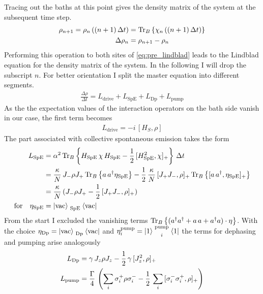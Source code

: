Tracing out the baths at this point gives the density matrix of the system at the subsequent time step. 
\begin{align*}
    \rho_{n+1}=\rho_n\left((n+1)\,\Delta t\right)&=\text{Tr}_B\left\{\chi_n\left((n+1)\,\Delta t\right)\right\}\\
    \Delta\rho_n&=\rho_{n+1}-\rho_n
\end{align*}
Performing this operation to both sites of \eqref{eq:pre_lindblad} leads to the Lindblad equation for the density matrix of the system. In the following I will drop the subscript $n$. For better orientation I split the master equation into different segments.
\begin{align*}
    \frac{\Delta\rho}{\Delta t}=L_\text{drive}+L_\text{SpE}+L_\text{Dp}+L_\text{pump}
\end{align*}
As the the expectation values of the interaction operators on the bath side vanish in our case, the first term becomes
\begin{align*}
    L_\text{drive}=-i\,[H_S,\rho]
\end{align*}
The part associated with collective spontaneous emission takes the form
\begin{align*}
    L_\text{SpE} &= \alpha^2\,\text{Tr}_B\left\{H_\text{SpE}\,\chi \,H_\text{SpE}-\frac{1}{2}\,[H_\text{SpE}^2,\chi]_+\right\}\,\Delta t\\
    &= \frac{\kappa}{N}\,J_-\rho J_+\,\text{Tr}_B\left\{a\,a^\dagger\eta_\text{SpE}\right\}-\frac{1}{2}\,\frac{\kappa}{N}\,[J_+J_-,\rho]_+\,\text{Tr}_B\left\{[a\,a^\dagger,\eta_\text{SpE}]_+\right\}\\
    &=\frac{\kappa}{N}\,(J_-\rho J_+-\frac{1}{2}\,[J_+J_-,\rho]_+)\\
    \text{for}\quad\eta_\text{SpE}&=\ket{\text{vac}}\mathrel{\substack{\,\\\,\\ \text{SpE}}}\bra{\text{vac}}
\end{align*}
From the start I excluded the vanishing terms $\text{Tr}_B\left\{(a^\dagger a^\dagger+a\,a+a^\dagger a)\cdot\eta\right\}$. With the choice $\eta_\text{Dp}=\ket{\text{vac}}\mathrel{\substack{\,\\\,\\ \text{Dp}}}\bra{\text{vac}}$ and $\eta^\text{pump}_i=\ket{1}\mathrel{\substack{\text{pump}\\\,\\ i}}\bra{1}$ the terms for dephasing and pumping arise analogously
\begin{align}
    L_\text{Dp}%
    &=\gamma\,J_z\rho J_z-\half\,\gamma\,[J_z^2,\rho]_+\\
    L_\text{pump}%
    &=\frac{\Gamma}{4}\,\left(\sum_i\sigma_i^+\rho \sigma_i^--\half\,\sum_i\,[\sigma_i^-\sigma_i^+,\rho]_+\right)\label{eq:pumping_Lindblad_op}
\end{align}
